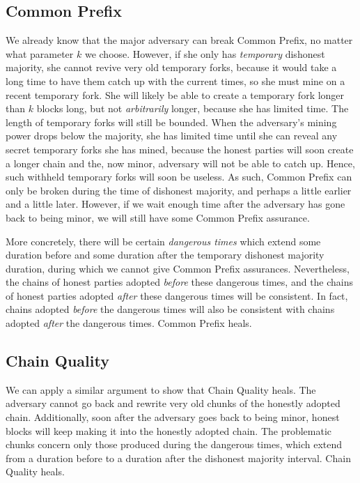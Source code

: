 \subsection*{Common Prefix}
We already know that the major adversary can break Common Prefix, no matter what parameter
$k$ we choose. However, if she only has \emph{temporary} dishonest majority, she cannot
revive very old temporary forks, because it would take a long time to have them catch up
with the current times, so she must mine on a recent temporary fork. She will likely be
able to create a temporary fork longer than $k$ blocks long, but not \emph{arbitrarily}
longer, because she has limited time. The length of temporary forks will still be bounded.
When the adversary's mining power drops below the majority, she has limited time until
she can reveal any secret temporary forks she has mined, because the honest parties will
soon create a longer chain and the, now minor, adversary will not be able to catch up.
Hence, such withheld temporary forks will soon be useless. As such, Common Prefix can only
be broken during the time of dishonest majority, and perhaps a little earlier and a little
later. However, if we wait enough time after the adversary has gone back to being minor,
we will still have some Common Prefix assurance.

More concretely, there will be certain \emph{dangerous times} which extend some duration
before and some duration after the temporary dishonest majority duration, during which
we cannot give Common Prefix assurances. Nevertheless, the chains of honest parties
adopted \emph{before} these dangerous times, and the chains of honest parties adopted
\emph{after} these dangerous times will be consistent. In fact, chains adopted \emph{before}
the dangerous times will also be consistent with chains adopted \emph{after} the dangerous
times. Common Prefix heals.

\subsection*{Chain Quality}
We can apply a similar argument to show that Chain Quality heals. The adversary cannot
go back and rewrite very old chunks of the honestly adopted chain. Additionally, soon after
the adversary goes back to being minor, honest blocks will keep making it into the honestly
adopted chain. The problematic chunks concern only those produced during the dangerous
times, which extend from a duration before to a duration after the dishonest majority
interval. Chain Quality heals.

